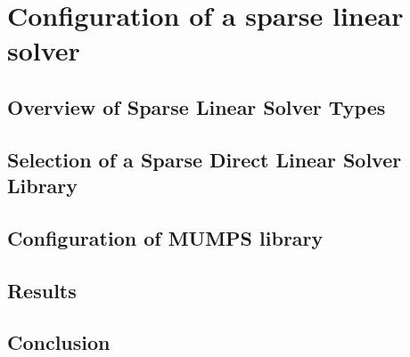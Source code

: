 \chapter{Configuration of a sparse linear solver}

	\section{Overview of Sparse Linear Solver Types} 
	

	\section{Selection of a Sparse Direct Linear Solver Library} \label{chapter:solver-selection}
	


	\section{Configuration of MUMPS library} 
	\label{mumps:solver-configuration}
	

	\section{Results}
	

	\section{Conclusion}
	

